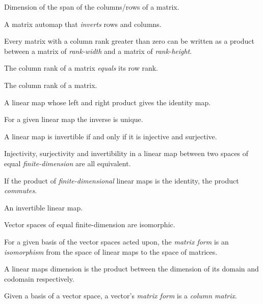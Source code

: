 \begin{multicols}{3}
  Dimension of the span of the columns/rows of a matrix.

  A matrix automap that \textit{inverts} rows and columns.

  Every matrix with a column rank greater than zero
  can be written as a product between
  a matrix of \textit{rank-width} and a matrix of \textit{rank-height}.

  The column rank of a matrix \textit{equals} its row rank.

  The column rank of a matrix.


  A linear map whose left and right product gives the identity map.

  For a given linear map the inverse is unique.

  A linear map is invertible if and only if it is injective and surjective.

  Injectivity, surjectivity and invertibility in a linear map between two spaces of equal \textit{finite-dimension} are all equivalent.

  If the product of \textit{finite-dimensional} linear maps is the identity, the product \textit{commutes}.

  An invertible linear map.

  Vector spaces of equal finite-dimension are isomorphic.

  For a given basis of the vector spaces acted upon, the \textit{matrix form} is an
  \textit{isomorphism} from the space of linear maps to the space of matrices.

  A linear maps dimension is the product between the dimension of its domain and codomain respectively.

  Given a basis of a vector space, a vector's \textit{matrix form} is a \textit{column matrix}.


\end{multicols}
